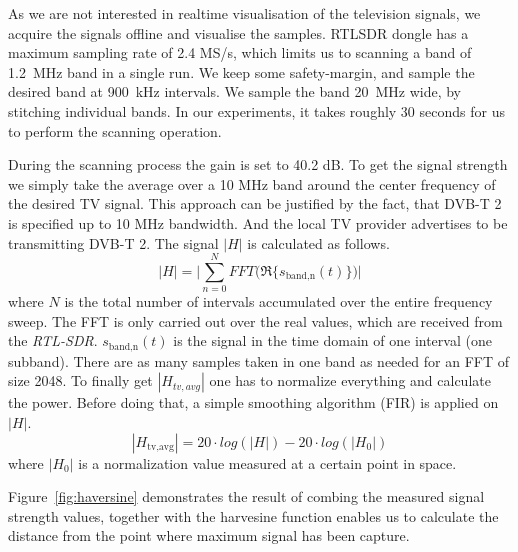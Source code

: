 As we are not interested in realtime visualisation of the television
signals, we acquire the signals offline and visualise the samples.
RTLSDR dongle has a maximum sampling rate of 2.4 MS/s, which limits us to
scanning a band of \SI{1.2}{\mega\hertz} band in a single run. We  keep some safety-margin, and
sample the desired band at \SI{900}{\kilo\hertz} intervals. We sample the band 
\SI{20}{\mega\hertz} wide, by stitching individual bands. In our experiments, it takes roughly 30
seconds for us to perform the scanning operation.


 
During the scanning process the gain is set to 40.2 dB. To get the
signal strength we simply take the average over a 10 MHz band around the
center frequency of the desired TV signal. This approach can be
justified by the fact, that DVB-T 2 is specified up to 10 MHz bandwidth.
And the local TV provider advertises to be transmitting DVB-T 2.
The signal \ensuremath{|H|} is calculated as follows.  
\begin{equation}
	|H| = \Biggl| \sum_{n=0}^N FFT\biggl( \Re\{ s_{\text{band,n}}(t) \} \biggr) \Biggr|
\end{equation}     where \ensuremath{N} is the total number of intervals
accumulated over the entire frequency sweep. The FFT is only carried out over
the real values, which are received from the \textit{RTL-SDR}.
\ensuremath{s_{\text{band,n}}(t)} is the signal in the time domain of one
interval (one subband). There are as many samples taken in one band as needed
for an FFT of size 2048. To finally get \ensuremath{|H_{tv,avg}|} one has to
normalize everything and calculate the power. Before doing that, a simple
smoothing algorithm (FIR) is applied on \ensuremath{|H|}.  
\begin{equation}
	|H_{\text{tv,avg}}| = 20 \cdot log (|H|) - 20 \cdot log(|H_0|)
\end{equation}   
where \ensuremath{|H_0|} is a normalization value measured at a certain point
in space. 

Figure~\ref{fig:haversine} demonstrates the result of combing the measured
signal strength values, together with the harvesine function enables us to
calculate the distance from the point where maximum signal has been
capture. 

